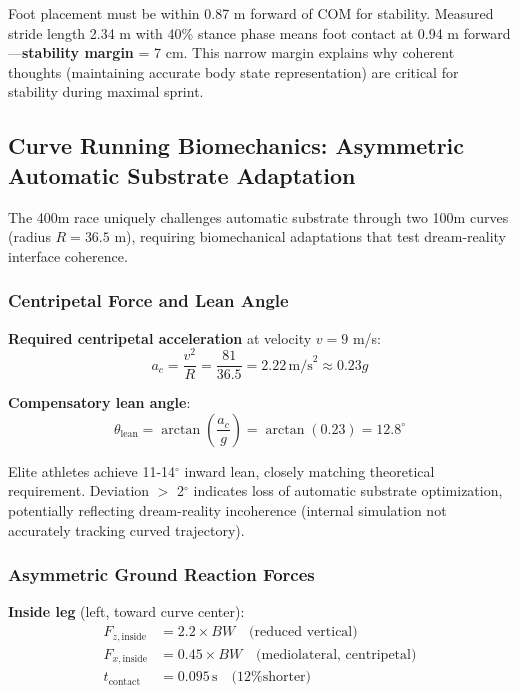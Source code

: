 \documentclass[11pt,onecolumn]{article}
\begin{document}
Foot placement must be within 0.87 m forward of COM for stability. Measured stride length 2.34 m with 40\% stance phase means foot contact at 0.94 m forward---\textbf{stability margin} = 7 cm. This narrow margin explains why coherent thoughts (maintaining accurate body state representation) are critical for stability during maximal sprint.

\subsection{Curve Running Biomechanics: Asymmetric Automatic Substrate Adaptation}

The 400m race uniquely challenges automatic substrate through two 100m curves (radius $R = 36.5$ m), requiring biomechanical adaptations that test dream-reality interface coherence.

\subsubsection{Centripetal Force and Lean Angle}

\textbf{Required centripetal acceleration} at velocity $v = 9$ m/s:
\begin{equation}
a_c = \frac{v^2}{R} = \frac{81}{36.5} = 2.22\,\text{m/s}^2 \approx 0.23g
\end{equation}

\textbf{Compensatory lean angle}:
\begin{equation}
\theta_{\text{lean}} = \arctan\left(\frac{a_c}{g}\right) = \arctan(0.23) = 12.8^\circ
\end{equation}

Elite athletes achieve 11-14$^\circ$ inward lean, closely matching theoretical requirement. Deviation $>$ 2$^\circ$ indicates loss of automatic substrate optimization, potentially reflecting dream-reality incoherence (internal simulation not accurately tracking curved trajectory).

\subsubsection{Asymmetric Ground Reaction Forces}

\textbf{Inside leg} (left, toward curve center):
\begin{align}
F_{z,\text{inside}} &= 2.2 \times BW \quad \text{(reduced vertical)} \\
F_{x,\text{inside}} &= 0.45 \times BW \quad \text{(mediolateral, centripetal)} \\
t_{\text{contact}} &= 0.095\,\text{s} \quad \text{(12\% shorter)}
\end{align}
\end{document}
